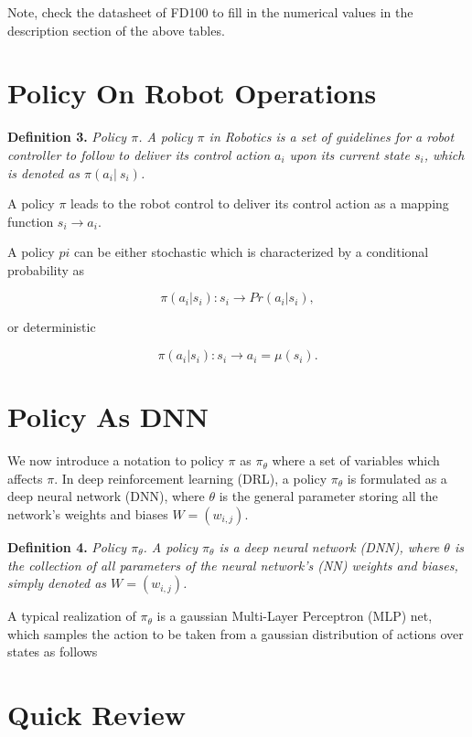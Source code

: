 \documentclass[conference]{IEEEtran}
\begin{document}
Note, check the datasheet of FD100 to fill in the numerical values in 
the description section of the above tables. 

\section{Policy On Robot Operations}

\textbf{Definition 3.} 
\textit{Policy $\pi$.
A policy $\pi$ in Robotics is a set of guidelines for 
a robot controller to follow to deliver its control action $a_i$ upon its 
current state $s_i$, which is denoted as $\pi (a_i |\ s_i)$. 
} 
  
  
A policy $\pi$ leads to the robot control to deliver
its control action as a mapping function $s_i \rightarrow a_i$. 

A policy $pi$ can be either stochastic which is characterized by a 
conditional probability as

\begin{equation}
\pi(a_i | s_i) : s_i \rightarrow Pr(a_i | s_i), 
\end{equation} 

or deterministic  

\begin{equation}
\pi(a_i | s_i) : s_i \rightarrow a_i = \mu (s_i).  
\end{equation} 

\section{Policy As DNN}

We now introduce a notation to policy $\pi$ as 
$\pi_{\theta}$ where a set of variables which affects $\pi .$
In deep reinforcement learning (DRL), a policy 
$\pi_{\theta}$ 
is formulated as a deep neural network
(DNN), where $\theta$ is the general parameter storing
all the network’s weights and biases $W=(w_{i,j})$.

\textbf{Definition 4.} 
\textit{Policy $\pi_{\theta}$.    
A policy $\pi_{\theta}$ is a deep neural network
(DNN), where $\theta$ is the collection of all parameters  
of the neural network’s (NN) weights and biases, simply 
denoted as $W=(w_{i,j})$. 
} 
 
A typical realization of $\pi_{\theta}$ is a
gaussian Multi-Layer Perceptron (MLP) net, which samples
the action to be taken from a gaussian distribution of actions
over states as follows 
 
 
\section{Quick Review}
 
\end{document}
